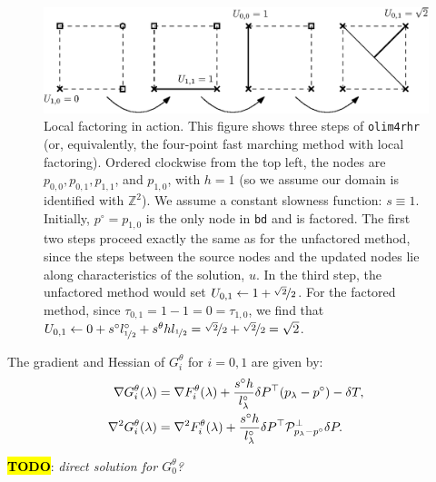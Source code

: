 \documentclass[eikonal.tex]{subfiles}
\begin{document}
\begin{figure}
  \centering
  \includegraphics{factoring-example.eps}
  \caption{Local factoring in action. This figure shows three steps of
    \texttt{olim4rhr} (or, equivalently, the four-point fast marching
    method with local factoring). Ordered clockwise from the top left,
    the nodes are $p_{0, 0}, p_{0, 1}, p_{1, 1}$, and $p_{1, 0}$, with
    $h = 1$ (so we assume our domain is identified with
    $\mathbb{Z}^2$). We assume a constant slowness function:
    $s \equiv 1$. Initially, $p^\circ = p_{1, 0}$ is the only node in
    \texttt{bd} and is factored. The first two steps proceed exactly
    the same as for the unfactored method, since the steps between the
    source nodes and the updated nodes lie along characteristics of
    the solution, $u$. In the third step, the unfactored method would
    set $U_{0,1} \gets 1 + \nicefrac{\sqrt{2}}{2}$. For the factored
    method, since $\tau_{0,1} = 1 - 1 = 0 = \tau_{1,0}$, we find that
    $U_{0,1} \gets 0 + s^\circ l^\circ_{\nicefrac{1}{2}} + s^\theta h l_{\nicefrac{1}{2}} =
    \nicefrac{\sqrt{2}}{2} + \nicefrac{\sqrt{2}}{2} = \sqrt{2}$.}
\end{figure}

\begin{lemma}
  The gradient and Hessian of $G_i^\theta$ for $i = 0, 1$ are given
  by:
  \begin{align}
    \label{eq:G-grad-hess}
    \nabla G_i^\theta(\lambda) &= \nabla F_i^\theta(\lambda) + \frac{s^\circ h}{l^\circ_\lambda} \delta P^\top {(p_\lambda - p^\circ)} - \delta T, \\
    \nabla^2 G_i^\theta(\lambda) &= \nabla^2 F_i^\theta(\lambda) + \frac{s^\circ h}{l^\circ_\lambda} \delta P^\top \calP^\perp_{p_\lambda - p^\circ} \delta P.
  \end{align}
\end{lemma}

\hl{\textbf{TODO}}: \emph{direct solution for $G_0^\theta$?}
\end{document}
